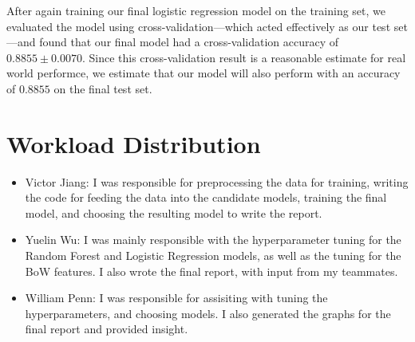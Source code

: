 \documentclass[12pt]{article}
\begin{document}
After again training our final logistic regression model on the training set, we evaluated the model using cross-validation—which acted effectively as our test set—and found that our final model had a cross-validation accuracy of $0.8855\pm 0.0070$. Since this cross-validation result is a reasonable estimate for real world performce, we estimate that our model will also perform with an accuracy of $0.8855$ on the final test set. \cite{sklearncrossval}

\section{Workload Distribution}

\begin{itemize}
	\item Victor Jiang: I was responsible for preprocessing the data for training, writing the code for feeding the data into the candidate models, training the final model, and choosing the resulting model to write the report.
	\item Yuelin Wu: I was mainly responsible with the hyperparameter tuning for the Random Forest and Logistic Regression models, as well as the tuning for the BoW features. I also wrote the final report, with input from my teammates.
	\item William Penn: I was responsible for assisiting with tuning the hyperparameters, and choosing models. I also generated the graphs for the final report and provided insight.
\end{itemize}



\end{document}
